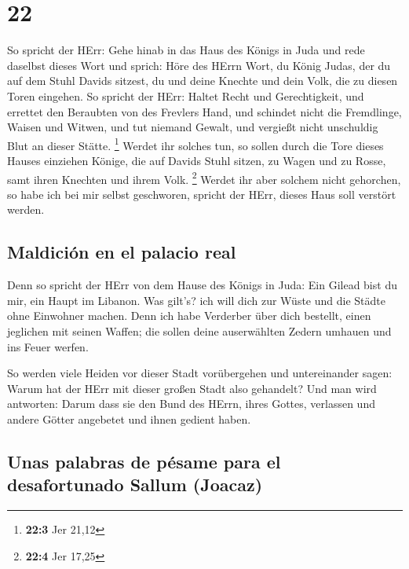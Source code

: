 \hypertarget{section-21}{%
\section{22}\label{section-21}}

 So spricht der HErr: Gehe hinab in das Haus des Königs in
Juda und rede daselbst dieses Wort  und sprich: Höre des
HErrn Wort, du König Judas, der du auf dem Stuhl Davids sitzest, du und
deine Knechte und dein Volk, die zu diesen Toren eingehen.
 So spricht der HErr: Haltet Recht und Gerechtigkeit, und
errettet den Beraubten von des Frevlers Hand, und schindet nicht die
Fremdlinge, Waisen und Witwen, und tut niemand Gewalt, und vergießt
nicht unschuldig Blut an dieser Stätte. \footnote{\textbf{22:3} Jer
  21,12}  Werdet ihr solches tun, so sollen durch die Tore
dieses Hauses einziehen Könige, die auf Davids Stuhl sitzen, zu Wagen
und zu Rosse, samt ihren Knechten und ihrem Volk. \footnote{\textbf{22:4}
  Jer 17,25}  Werdet ihr aber solchem nicht gehorchen, so
habe ich bei mir selbst geschworen, spricht der HErr, dieses Haus soll
verstört werden.

\hypertarget{maldiciuxf3n-en-el-palacio-real}{%
\subsection{Maldición en el palacio
real}\label{maldiciuxf3n-en-el-palacio-real}}

 Denn so spricht der HErr von dem Hause des Königs in
Juda: Ein Gilead bist du mir, ein Haupt im Libanon. Was gilt's? ich will
dich zur Wüste und die Städte ohne Einwohner machen.  Denn
ich habe Verderber über dich bestellt, einen jeglichen mit seinen
Waffen; die sollen deine auserwählten Zedern umhauen und ins Feuer
werfen.

 So werden viele Heiden vor dieser Stadt vorübergehen und
untereinander sagen: Warum hat der HErr mit dieser großen Stadt also
gehandelt?  Und man wird antworten: Darum dass sie den
Bund des HErrn, ihres Gottes, verlassen und andere Götter angebetet und
ihnen gedient haben.

\hypertarget{unas-palabras-de-puxe9same-para-el-desafortunado-sallum-joacaz}{%
\subsection{Unas palabras de pésame para el desafortunado Sallum
(Joacaz)}\label{unas-palabras-de-puxe9same-para-el-desafortunado-sallum-joacaz}}

